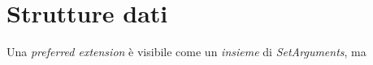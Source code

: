 \section{Strutture dati}
Una \emph{preferred extension} è visibile come un \emph{insieme} di
\emph{SetArguments}, ma 
